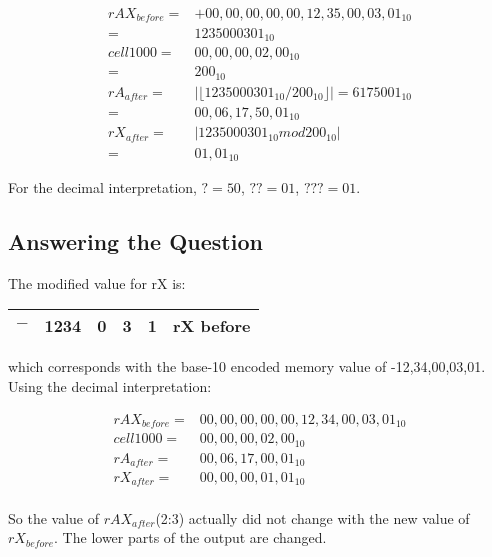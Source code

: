 \documentclass{article}
\begin{document}
\begin{align*}
    rAX_{before} = &+00,00,00,00,00,12,35,00,03,01_{10} \\
    = &1235000301_{10} \\
    cell1000 = &00,00,00,02,00_{10} \\
    = &200_{10} \\
    rA_{after} = &| \lfloor 1235000301_{10} / 200_{10} \rfloor | = 6175001_{10} \\
    = & 00,06,17,50,01_{10} \\
    rX_{after} = &| 1235000301_{10} mod 200_{10} | \\
    = & 01,01_{10}
\end{align*}

For the decimal interpretation, $? = 50$, $?? = 01$, $??? = 01$.

\subsection*{Answering the Question}

The modified value for rX is:

\vspace*{1em}

\begin{tabular}{|c|c|c|c|c|c|c|}
    \hline
    $-$ & \multicolumn{2}{c|}{1234} & 0 & 3 & 1 & rX before \\
    \hline
\end{tabular}

\vspace*{1em}

which corresponds with the base-10 encoded memory value of
-12,34,00,03,01.  Using the decimal interpretation:

\begin{align*}
    rAX_{before} = &00,00,00,00,00,12,34,00,03,01_{10} \\
    cell1000 = &00,00,00,02,00_{10} \\
    rA_{after} = &00,06,17,00,01_{10} \\
    rX_{after} = &00,00,00,01,01_{10} \\
\end{align*}

So the value of $rAX_{after}$(2:3) actually did not change with the
new value of $rX_{before}$. The lower parts of the output are
changed.
\end{document}
